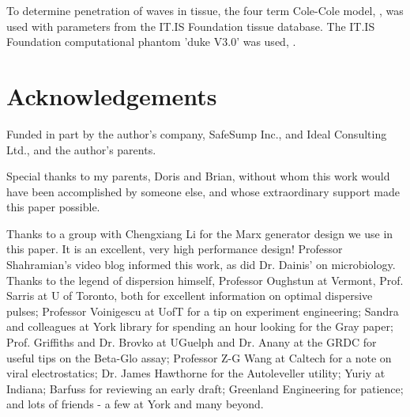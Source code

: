 \documentclass[paper.tex]{subfiles}
\begin{document}
\begin{multicols}{1}
To determine penetration of waves in tissue, the four term Cole-Cole model\cite{gabriel1996compilation}, , was used with parameters from the IT.IS Foundation tissue database\cite{Tissue2018a}. The IT.IS Foundation computational phantom 'duke V3.0' was used, \cite{Duke2014}.



%	



\end{multicols}

\section{Acknowledgements}

Funded in part by the author's company, SafeSump Inc., and Ideal Consulting Ltd., and the author's parents.

Special thanks to my parents, Doris and Brian, without whom this work would have been accomplished by someone else, and whose extraordinary support made this paper possible.

Thanks to a group with Chengxiang Li for the Marx generator design we use in this paper. It is an excellent, very high performance design! Professor Shahramian's video blog informed this work, as did Dr. Dainis' on microbiology. Thanks to the legend of dispersion himself, Professor Oughstun at Vermont, Prof. Sarris at U of Toronto, both for excellent information on optimal dispersive pulses; Professor Voinigescu at UofT for a tip on experiment engineering; Sandra and colleagues at York library for spending an hour looking for the Gray paper; Prof. Griffiths and Dr. Brovko at UGuelph and Dr. Anany at the GRDC for useful tips on the Beta-Glo assay; Professor Z-G Wang at Caltech for a note on viral electrostatics; Dr. James Hawthorne for the Autoleveller utility; Yuriy at Indiana; Barfuss for reviewing an early draft; Greenland Engineering for patience; and lots of friends - a few at York and many beyond. 
\end{document}
